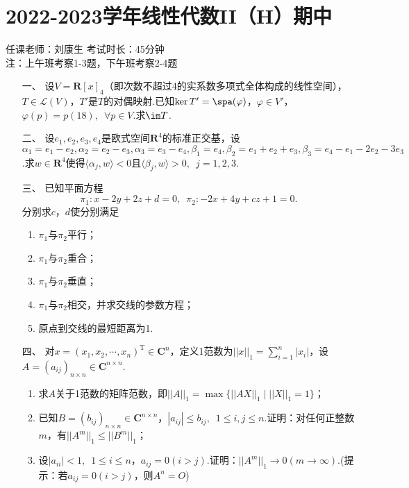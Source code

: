 \section*{2022-2023学年线性代数II（H）期中}

\begin{center}
    任课老师：刘康生\hspace{4em} 考试时长：45分钟 \\
    注：上午班考察1-3题，下午班考察2-4题
\end{center}

\begin{enumerate}
	\item[一、]设$V=\mathbf{R}[x]_4$（即次数不超过4的实系数多项式全体构成的线性空间），$T\in\mathcal{L}(V)$，$T'$是$T$的对偶映射.已知$\ker T'=\spa(\varphi)$，$\varphi\in V'$，$\varphi(p)=p(18),\enspace\forall p\in V$.求$\im T$.
	\item[二、]设$e_1,e_2,e_3,e_4$是欧式空间$\mathbf{R}^4$的标准正交基，设$\alpha_1=e_1-e_2,\alpha_2=e_2-e_3,\alpha_3=e_3-e_4,\beta_1=e_4,\beta_2=e_1+e_2+e_3,\beta_3=e_4-e_1-2e_2-3e_3$.求$w\in\mathbf{R}^4$使得$\langle\alpha_j,w\rangle<0$且$\langle\beta_j,w\rangle>0,\enspace j=1,2,3$.
	\item[三、]已知平面方程
    \[\pi_1:x-2y+2z+d=0,\enspace \pi_2:-2x+4y+cz+1=0.\]
    分别求$c$，$d$使分别满足
    \begin{enumerate}[label=(\arabic*)]
        \item $\pi_1$与$\pi_2$平行；
        \item $\pi_1$与$\pi_2$重合；
        \item $\pi_1$与$\pi_2$垂直；
        \item $\pi_1$与$\pi_2$相交，并求交线的参数方程；
        \item 原点到交线的最短距离为1.
    \end{enumerate}
	\item[四、]对$x=(x_1,x_2,\cdots,x_n)^\mathrm{T}\in\mathbf{C}^n$，定义1范数为$||x||_1=\sum\limits_{i=1}^n|x_i|$，设$A=(a_{ij})_{n\times n}\in\mathbf{C}^{n\times n}$.
	\begin{enumerate}[label=(\arabic*)]
        \item 求$A$关于1范数的矩阵范数，即$||A||_1=\max\{||AX||_1\mid ||X||_1=1\}$；
        \item 已知$B=(b_{ij})_{n\times n}\in\mathbf{C}^{n\times n}$，$|a_{ij}|\le b_{ij},\enspace 1\leqslant i,j\leqslant n$.证明：对任何正整数$m$，有$||A^m||_1\leqslant||B^m||_1$；
        \item 设$|a_{ii}|<1,\enspace 1\leqslant i\leqslant n$，$a_{ij}=0(i>j)$.证明：$||A^m||_1\to 0(m\to\infty)$.(提示：若$a_{ij}=0(i>j)$，则$A^n=O$)
    \end{enumerate}
\end{enumerate}
\newpage
